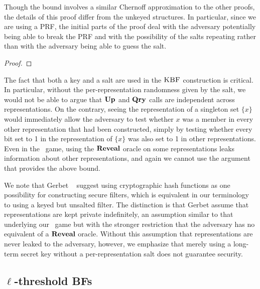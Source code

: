 Though the bound involves a similar Chernoff approximation to the other proofs,
the details of this proof differ from the unkeyed structures. In particular,
since we are using a PRF, the initial parts of the proof deal with the adversary
potentially being able to break the PRF and with the possibility of the salts
repeating rather than with the adversary being able to guess the salt.

\begin{proof}
  
\end{proof}

The fact that both a key and a salt are used in the $\textnormal{\textsc{KBF}}$ construction is
critical. In particular, without the per-representation randomness given by the
salt, we would not be able to argue that $\textup{\textbf{Up}}\hspace{0.5pt}$ and $\textup{\textbf{Qry}}\hspace{0.5pt}$ calls are
independent across representations. On the contrary, seeing the representation
of a singleton set $\{x\}$ would immediately allow the adversary to test whether
$x$ was a member in every other representation that had been constructed, simply
by testing whether every bit set to 1 in the representation of $\{x\}$ was also
set to 1 in other representations. Even in the \erreps\ game, using the $\mathbf{Reveal}$
oracle on some representations leaks information about other representations,
and again we cannot use the argument that provides the above bound.

We note that Gerbet \etal~\cite{gerbet2015power} suggest using cryptographic
hash functions as one possibility for constructing secure filters, which is
equivalent in our terminology to using a keyed but unsalted filter. The
distinction is that Gerbet \etal assume that representations are kept private
indefinitely, an assumption similar to that underlying our \erreps\ game but
with the stronger restriction that the adversary has no equivalent of a $\mathbf{Reveal}$
oracle. Without this assumption that representations are never leaked to the
adversary, however, we emphasize that merely using a long-term secret key
without a per-representation salt does not guarantee security.

\subsection{$\ell$-threshold BFs}\label{sec:bf-thresh}

